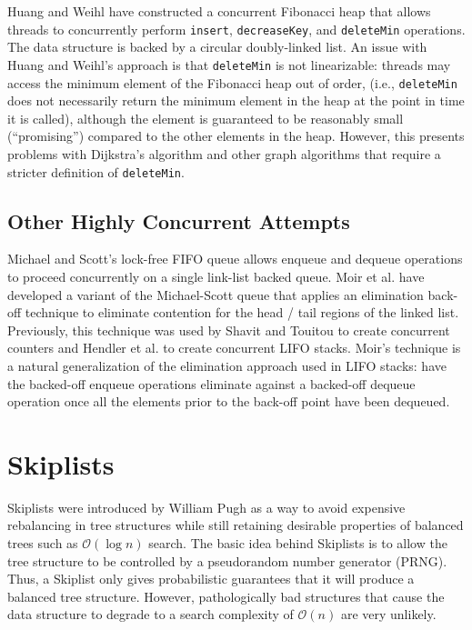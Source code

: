 \documentclass{acm_proc_article-sp}
\begin{document}
Huang and Weihl \cite{huang91} have constructed a concurrent Fibonacci heap
that allows threads to concurrently perform \texttt{insert}, \texttt{decreaseKey}, and
\texttt{deleteMin} operations. The data structure is backed by a circular doubly-linked
list. An issue with Huang and Weihl's approach is that \texttt{deleteMin} is not
linearizable: threads may access the minimum element of the Fibonacci heap out of
order, (i.e., \texttt{deleteMin} does not necessarily return the minimum element in the heap at
the point in time it is called), although the element is guaranteed to be reasonably small (``promising'') compared to the other
elements in the heap. However, this presents problems with Dijkstra's algorithm and other
graph algorithms that require a stricter definition of \texttt{deleteMin}.

\subsection{Other Highly Concurrent Attempts}
Michael and Scott's \cite{michael96} lock-free FIFO queue allows enqueue
and dequeue operations to proceed concurrently on a
single link-list backed queue. Moir et al. have developed
\cite{moir05} a variant of the Michael-Scott queue that applies
an elimination back-off technique to eliminate contention for the
head / tail regions of the linked list. Previously, this
technique was used by Shavit and Touitou \cite{shavit97} to create
concurrent counters and Hendler et al.  \cite{hendler04} to create concurrent LIFO
stacks. Moir's technique is a natural generalization of the elimination
approach used in LIFO stacks: have the backed-off enqueue operations
eliminate against a backed-off dequeue operation once all the elements prior
to the back-off point have been dequeued.

\section{Skiplists}
\label{sec:skiplists}

Skiplists were introduced by William Pugh \cite{pugh90} as a way
to avoid expensive rebalancing in tree structures while
still retaining desirable properties of balanced
trees such as $\mathcal{O}(\log n)$ search. The basic
idea behind Skiplists is to allow the tree structure
to be controlled by a pseudorandom number generator (PRNG). Thus,
a Skiplist only gives probabilistic guarantees that it will
produce a balanced tree structure.
However, pathologically bad structures that cause the data structure to degrade
to a search complexity of $\mathcal{O}(n)$ are very unlikely.
\end{document}
